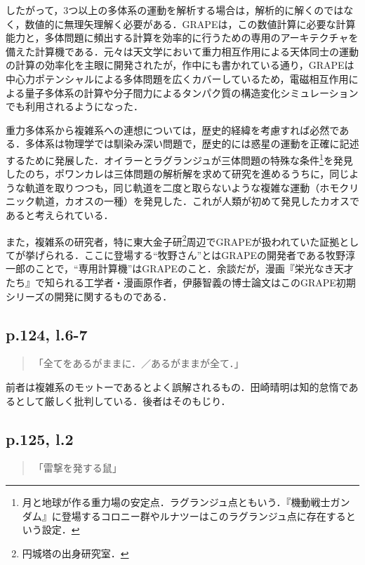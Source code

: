 \documentclass[10pt, a5paper, twoside]{ltjsarticle}
\begin{document}
            したがって，3つ以上の多体系の運動を解析する場合は，解析的に解くのではなく，数値的に無理矢理解く必要がある．GRAPEは，この数値計算に必要な計算能力と，多体問題に頻出する計算を効率的に行うための専用のアーキテクチャを備えた計算機である．元々は天文学において重力相互作用による天体同士の運動の計算の効率化を主眼に開発されたが，作中にも書かれている通り，GRAPEは中心力ポテンシャルによる多体問題を広くカバーしているため，電磁相互作用による量子多体系の計算や分子間力によるタンパク質の構造変化シミュレーションでも利用されるようになった．

            重力多体系から複雑系への連想については，歴史的経緯を考慮すれば必然である．多体系は物理学では馴染み深い問題で，歴史的には惑星の運動を正確に記述するために発展した．オイラーとラグランジュが三体問題の特殊な条件\footnote{月と地球が作る重力場の安定点．ラグランジュ点ともいう．『機動戦士ガンダム』に登場するコロニー群やルナツーはこのラグランジュ点に存在するという設定．}を発見したのち，ポワンカレは三体問題の解析解を求めて研究を進めるうちに，同じような軌道を取りつつも，同じ軌道を二度と取らないような複雑な運動（ホモクリニック軌道，カオスの一種）を発見した．これが人類が初めて発見したカオスであると考えられている．

            また，複雑系の研究者，特に東大金子研\footnote{円城塔の出身研究室．}周辺でGRAPEが扱われていた証拠として\cite{tskcri}が挙げられる．ここに登場する“牧野さん”とはGRAPEの開発者である牧野淳一郎のことで，“専用計算機”はGRAPEのこと．余談だが，漫画『栄光なき天才たち』で知られる工学者・漫画原作者，伊藤智義の博士論文はこのGRAPE初期シリーズの開発に関するものである．

        \subsection{p.124, l.6-7}

            \begin{quote}
                「全てをあるがままに．／あるがままが全て．」
            \end{quote}

            前者は複雑系のモットーであるとよく誤解されるもの．田崎晴明は知的怠惰であるとして厳しく批判している\cite{tskcri}．後者はそのもじり．

        \subsection{p.125, l.2}

            \begin{quote}
                「雷撃を発する鼠」
            \end{quote}
\end{document}
